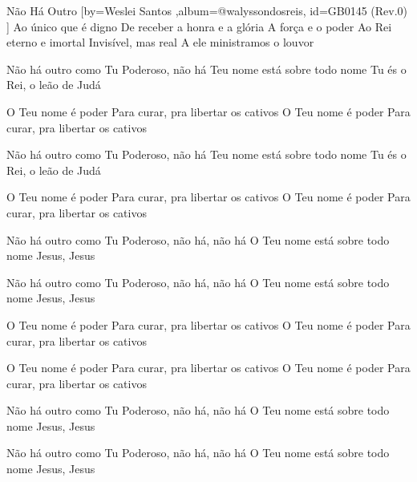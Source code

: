 \beginsong
{Não Há Outro %
}[by={Weslei Santos %
},album={@walyssondosreis},
id={GB0145 %
(Rev.0) %
}]
Ao único que é digno
De receber a honra e a glória
A força e o poder
Ao Rei eterno e imortal
Invisível, mas real
A ele ministramos o louvor

Não há outro como Tu
Poderoso, não há
Teu nome está sobre todo nome
Tu és o Rei, o leão de Judá

O Teu nome é poder
Para curar, pra libertar os cativos
O Teu nome é poder
Para curar, pra libertar os cativos

Não há outro como Tu
Poderoso, não há
Teu nome está sobre todo nome
Tu és o Rei, o leão de Judá

O Teu nome é poder
Para curar, pra libertar os cativos
O Teu nome é poder
Para curar, pra libertar os cativos

Não há outro como Tu
Poderoso, não há, não há
O Teu nome está sobre todo nome
Jesus, Jesus

Não há outro como Tu
Poderoso, não há, não há
O Teu nome está sobre todo nome
Jesus, Jesus

O Teu nome é poder
Para curar, pra libertar os cativos
O Teu nome é poder
Para curar, pra libertar os cativos

O Teu nome é poder
Para curar, pra libertar os cativos
O Teu nome é poder
Para curar, pra libertar os cativos

Não há outro como Tu
Poderoso, não há, não há
O Teu nome está sobre todo nome
Jesus, Jesus

Não há outro como Tu
Poderoso, não há, não há
O Teu nome está sobre todo nome
Jesus, Jesus


